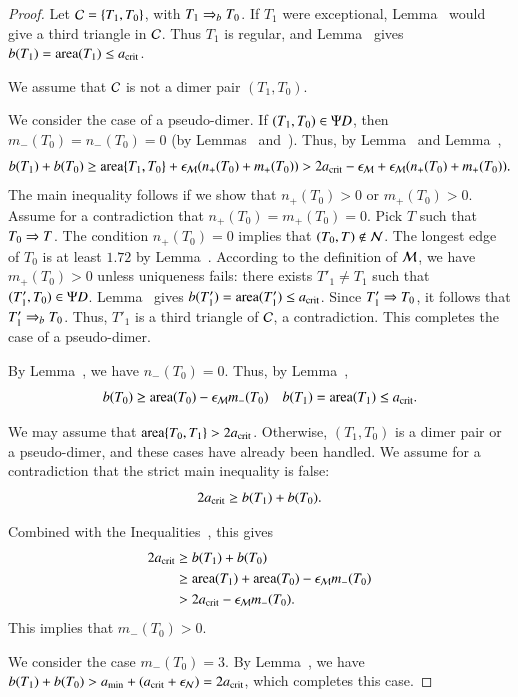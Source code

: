 \begin{proof}  
  Let $\mathcal C = \{T_1,T_0\}$, with $T_1\Rightarrow_{b} T_0$. If $T_1$
  were exceptional, Lemma~ would give a third
  triangle in $\mathcal C$. Thus $T_1$ is regular, and
  Lemma~ gives $b(T_1)={\operatorname{area}}(T_1)\le a_\text{crit}$.

  We assume that $\mathcal C$ is not a dimer pair $(T_1,T_0)$.

  We consider the case of a pseudo-dimer.  If $(T_1,T_0)\in\Psi D$, then
  $m_-(T_0)=n_-(T_0)=0$ (by Lemmas~
  and~).  Thus, by Lemma~ and
  Lemma~,
\[
b(T_1)+b(T_0) 
\ge {\operatorname{area}}\{T_1,T_0\} + \epsilon_{\mathcal M} (n_+(T_0) + m_+(T_0)) 
> 2a_\text{crit} - \epsilon_{\mathcal M}  + \epsilon_{\mathcal M} (n_+(T_0)+m_+(T_0)).
\]
The main inequality follows if we show that $n_+(T_0)>0$ or
$m_+(T_0)>0$.  Assume for a contradiction that $n_+(T_0)=m_+(T_0)=0$.
Pick $T$ such that $T_0\Rightarrow T$.  The condition $n_+(T_0)=0$ implies
that $(T_0,T)\not\in\mathcal N$.  The longest edge of $T_0$ is at least $1.72$
by Lemma~.  According to the definition of $\mathcal M$, we
have $m_+(T_0)>0$ unless uniqueness fails: there exists $T'_1\ne T_1$
such that $(T'_1,T_0)\in\Psi D$.  Lemma~ gives
$b(T'_1)={\operatorname{area}}(T'_1)\le a_\text{crit}$.  Since $T'_1\Rightarrow T_0$, it follows
that $T'_1\Rightarrow_{b} T_0$.  Thus, $T'_1$ is a third triangle of $\mathcal C$,
a contradiction.  This completes the case of a pseudo-dimer.

By Lemma~, we have $n_-(T_0)=0$.  Thus,
by Lemma~,
\begin{equation}\libel{eqn:2}
b(T_0) \ge \area(T_0)  - \epsM m_-(T_0)
\quad b(T_1) = \area(T_1) \le \acrit.
\end{equation}

We may assume that ${\operatorname{area}}\{T_0,T_1\}> 2a_\text{crit}$.  Otherwise,
$(T_1,T_0)$ is a dimer pair or a pseudo-dimer, and these cases have
already been handled.  We assume for a contradiction that the
strict main inequality is false:
\[
2a_\text{crit} \ge b(T_1) + b(T_0).
\]

Combined with the Inequalities~,
this gives
\begin{align*}
2a_\text{crit} &\ge b(T_1) + b(T_0) \\
&\ge {\operatorname{area}}(T_1) + {\operatorname{area}}(T_0)  - \epsilon_{\mathcal M} m_-(T_0)\\
&> 2a_\text{crit}  - \epsilon_{\mathcal M} m_-(T_0).
\end{align*}
This implies that  $m_-(T_0) > 0$.

We consider the case $m_-(T_0)= 3$.  By Lemma~, we have
$b(T_1) + b(T_0) > a_\text{min} + (a_\text{crit} + \epsilon_{\mathcal N}) = 2a_\text{crit}$, which completes
this case.


\end{proof}
